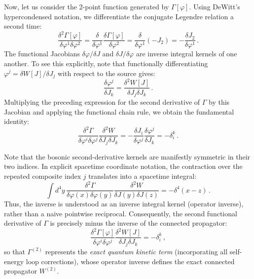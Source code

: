 Now, let us consider the 2-point function generated by \(\Gamma[\varphi]\). Using DeWitt's hypercondensed notation, we differentiate the conjugate Legendre relation a second time:
\begin{equation} \label{eq:gamma_two_point_initial}
    \frac{\delta^2 \Gamma[\varphi]}{\delta \varphi^1 \delta \varphi^2} = \frac{\delta}{\delta \varphi^1} \frac{\delta \Gamma[\varphi]}{\delta \varphi^2} = \frac{\delta}{\delta \varphi^1} (-J_2) = -\frac{\delta J_2}{\delta \varphi^1} \, .
\end{equation}
The functional Jacobians \(\delta \varphi / \delta J\) and \(\delta J / \delta \varphi\) are inverse integral kernels of one another. To see this explicitly, note that functionally differentiating \(\varphi^j = \delta W[J] / \delta J_j\) with respect to the source gives:
\begin{equation} \label{eq:jacobian_w_two_point}
    \frac{\delta \varphi^j}{\delta J_k} = \frac{\delta^2 W[J]}{\delta J_j \delta J_k} \, .
\end{equation}
Multiplying the preceding expression for the second derivative of \(\Gamma\) by this Jacobian and applying the functional chain rule, we obtain the fundamental identity:
\begin{equation} \label{eq:gamma_w_inverse_condensed}
    \frac{\delta^2 \Gamma}{\delta \varphi^i \delta \varphi^j} \frac{\delta^2 W}{\delta J_j \delta J_k} = -\frac{\delta J_i}{\delta \varphi^j} \frac{\delta \varphi^j}{\delta J_k} = -\delta_i^k \, .
\end{equation}

Note that the bosonic second-derivative kernels are manifestly symmetric in their two indices. In explicit spacetime coordinate notation, the contraction over the repeated composite index \(j\) translates into a spacetime integral:
\begin{equation} \label{eq:gamma_w_inverse_spacetime}
    \int d^4y \, \frac{\delta^2 \Gamma}{\delta \varphi(x) \delta \varphi(y)} \frac{\delta^2 W}{\delta J(y) \delta J(z)} = -\delta^4(x - z) \, .
\end{equation}
Thus, the inverse is understood as an inverse integral kernel (operator inverse), rather than a naive pointwise reciprocal. Consequently, the second functional derivative of \(\Gamma\) is precisely minus the inverse of the connected propagator:
\begin{equation} \label{eq:exact_propagator_inversion}
    \boxed{\frac{\delta^2 \Gamma[\varphi]}{\delta \varphi^i \delta \varphi^j} \frac{\delta^2 W[J]}{\delta J_j \delta J_k} = -\delta_i^k} \, ,
\end{equation}
so that \(\Gamma^{(2)}\) represents the \textit{exact quantum kinetic term} (incorporating all self-energy loop corrections), whose operator inverse defines the exact connected propagator \(W^{(2)}\).

